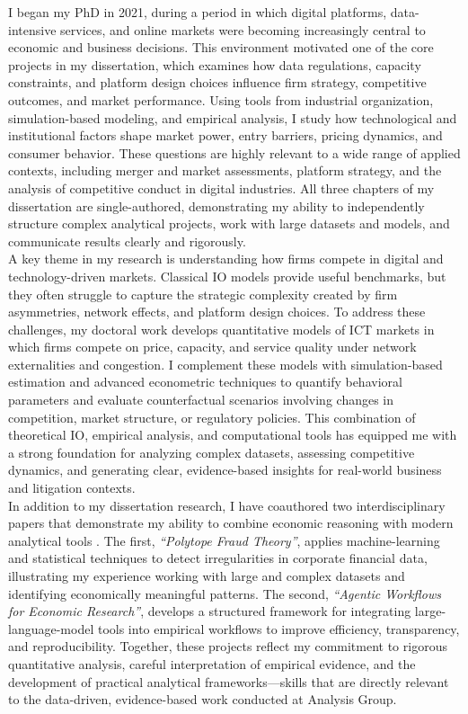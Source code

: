 \documentclass{nfr}
\begin{document}
I began my PhD in 2021, during a period in which digital platforms, data-intensive services, and online markets were becoming increasingly central to economic and business decisions. 
This environment motivated one of the core projects in my dissertation, which examines how data regulations, capacity constraints, and platform design choices influence firm strategy, competitive outcomes, and market performance. 
Using tools from industrial organization, simulation-based modeling, and empirical analysis, I study how technological and institutional factors shape market power, entry barriers, pricing dynamics, and consumer behavior. 
These questions are highly relevant to a wide range of applied contexts, including merger and market assessments, platform strategy, and the analysis of competitive conduct in digital industries. 
All three chapters of my dissertation are single-authored, demonstrating my ability to independently structure complex analytical projects, work with large datasets and models, and communicate results clearly and rigorously.\\

A key theme in my research is understanding how firms compete in digital and technology-driven markets. 
Classical IO models provide useful benchmarks, but they often struggle to capture the strategic complexity created by firm asymmetries, network effects, and platform design choices. 
To address these challenges, my doctoral work develops quantitative models of ICT markets in which firms compete on price, capacity, and service quality under network externalities and congestion. 
I complement these models with simulation-based estimation and advanced econometric techniques to quantify behavioral parameters and evaluate counterfactual scenarios involving changes in competition, market structure, or regulatory policies. 
This combination of theoretical IO, empirical analysis, and computational tools has equipped me with a strong foundation for analyzing complex datasets, assessing competitive dynamics, and generating clear, evidence-based insights for real-world business and litigation contexts.\\

In addition to my dissertation research, I have coauthored two interdisciplinary papers that demonstrate my ability to combine economic reasoning with modern analytical tools \citep{Zhao2025, Dawid2025}. 
The first, \textit{“Polytope Fraud Theory”}, applies machine-learning and statistical techniques to detect irregularities in corporate financial data, illustrating my experience working with large and complex datasets and identifying economically meaningful patterns. 
The second, \textit{“Agentic Workflows for Economic Research”}, develops a structured framework for integrating large-language-model tools into empirical workflows to improve efficiency, transparency, and reproducibility. 
Together, these projects reflect my commitment to rigorous quantitative analysis, careful interpretation of empirical evidence, and the development of practical analytical frameworks—skills that are directly relevant to the data-driven, evidence-based work conducted at Analysis Group.\\
\end{document}
